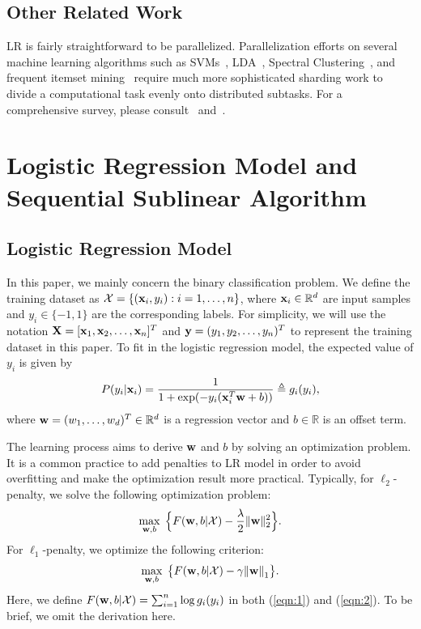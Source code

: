 \documentclass[10pt, conference, compsocconf]{IEEEtran}
\newcommand{\bw}{\mathbf{w}}
\def\X{{\bf X}}
\def\x{{\bf x}}
\def\y{{\bf y}}
\def\w{{\bf w}}
\def\XM{{\mathcal X}}
\def\RB{{\mathbb R}}
\begin{document}
\subsection{Other Related Work}

LR is fairly straightforward to be parallelized.   Parallelization efforts on several machine learning algorithms such as SVMs~\cite{chang2011psvm}, LDA~\cite{Liu:2011:PPL:1961189.1961198}, Spectral Clustering~\cite{Chen5444877}, and frequent itemset mining~\cite{Li:2008:PPF:1454008.1454027} require much more sophisticated sharding work to divide a computational task evenly onto distributed subtasks.  For a comprehensive survey, please consult~\cite{chang2011foundations} and~\cite{Bekkerman2012}.

\section{Logistic Regression Model and Sequential Sublinear Algorithm} \label{sec:plr}

\subsection{Logistic Regression Model} \label{sec:def}
In this paper, we mainly concern the binary classification problem.  	
We define the training dataset as $\XM=\{(\x_i, y_i): i=1, \ldots, n\}$, where $\x_i \in \RB^d$ are input samples and $y_i \in \{-1, 1\}$ are the corresponding labels.
For simplicity, we will use the notation $\X=[{\x}_{1}, {\x}_{2}, \ldots, {\x}_n]^{T}$ and $\y=(y_1, y_2, \ldots, y_n)^T$ to represent the training dataset in this paper.
To fit in the logistic regression model, the expected value of $y_i$ is given by\vspace{-0.2cm}
\[
P(y_i|\x_i)= \frac{1}{1+ \exp(- y_i(\x_i^T \w + b))} \triangleq g_i(y_i),\vspace{-0.2cm}
\]
where $\w=(w_1, \ldots, w_d)^T \in \RB^d$ is a regression vector and $b\in \RB$ is an offset term.

The learning process aims to derive $\w$ and $b$ by solving an optimization problem.
It is a common practice to add penalties to LR model in order to avoid overfitting and make the optimization result more practical.
Typically, for $\ell_2$-penalty, we solve the following optimization problem:\vspace{-0.2cm}
\begin{equation} \label{eqn:1}
	\max_{\bw ,b} \; \Big\{F(\w, b| \XM) - \frac{\lambda}{2}  \|\bw\|_2^{2} \Big\}.\vspace{-0.2cm}
\end{equation}
For $\ell_1$-penalty, we optimize the following criterion: \vspace{-0.2cm}
\begin{equation} \label{eqn:2}
	\max_{\bw ,b} \;  \big\{F(\w, b|\XM)- \gamma{\|\bw \|}_{1}\big\}.\vspace{-0.2cm}	
\end{equation}
Here, we define $F(\w, b| \XM) = \sum_{i=1}^n \log g_i(y_i)$ in both (\ref{eqn:1}) and (\ref{eqn:2}). To be brief, we omit the derivation here.
\end{document}
